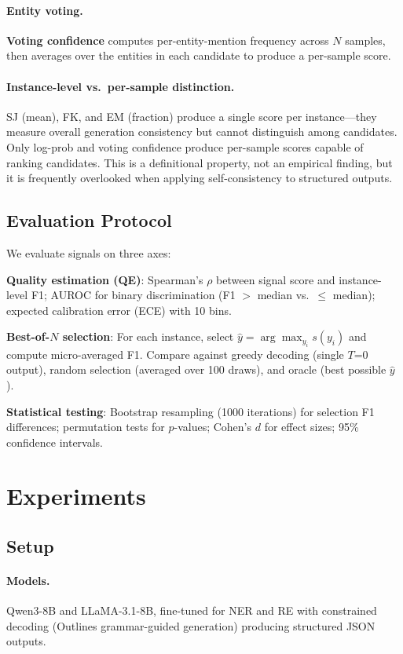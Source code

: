 \documentclass[11pt,a4paper]{article}
\begin{document}
\paragraph{Entity voting.} \textbf{Voting confidence} computes per-entity-mention frequency across $N$ samples, then averages over the entities in each candidate to produce a per-sample score.

\paragraph{Instance-level vs.\ per-sample distinction.} SJ (mean), FK, and EM (fraction) produce a single score per instance---they measure overall generation consistency but cannot distinguish among candidates. Only log-prob and voting confidence produce per-sample scores capable of ranking candidates. This is a definitional property, not an empirical finding, but it is frequently overlooked when applying self-consistency to structured outputs.

\subsection{Evaluation Protocol}

We evaluate signals on three axes:

\textbf{Quality estimation (QE)}: Spearman's $\rho$ between signal score and instance-level F1; AUROC for binary discrimination (F1 $>$ median vs.\ $\leq$ median); expected calibration error (ECE) with 10 bins.

\textbf{Best-of-$N$ selection}: For each instance, select $\hat{y} = \arg\max_{y_i} s(y_i)$ and compute micro-averaged F1. Compare against greedy decoding (single $T$=0 output), random selection (averaged over 100 draws), and oracle (best possible $\hat{y}$).

\textbf{Statistical testing}: Bootstrap resampling (1000 iterations) for selection F1 differences; permutation tests for $p$-values; Cohen's $d$ for effect sizes; 95\% confidence intervals.

\section{Experiments}

\subsection{Setup}

\paragraph{Models.} Qwen3-8B and LLaMA-3.1-8B, fine-tuned for NER and RE with constrained decoding (Outlines grammar-guided generation) producing structured JSON outputs.
\end{document}
